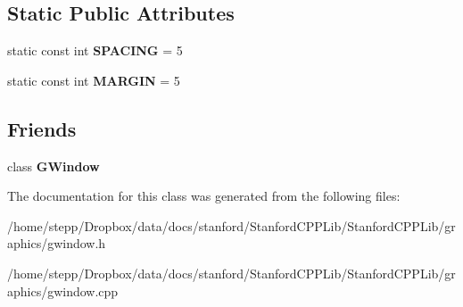 \subsection*{Static Public Attributes}
\begin{DoxyCompactItemize}
\item 
\mbox{\label{class__Internal__QMainWindow_aba0595b4af9c44ed5d2b7edead3c6657}} 
static const int {\bfseries S\+P\+A\+C\+I\+NG} = 5
\item 
\mbox{\label{class__Internal__QMainWindow_ac3393d499999d6641e5c3450747d3c03}} 
static const int {\bfseries M\+A\+R\+G\+IN} = 5
\end{DoxyCompactItemize}
\subsection*{Friends}
\begin{DoxyCompactItemize}
\item 
\mbox{\label{class__Internal__QMainWindow_a20230fe9431fcdad4afa6bfec61b5833}} 
class {\bfseries G\+Window}
\end{DoxyCompactItemize}


The documentation for this class was generated from the following files\+:\begin{DoxyCompactItemize}
\item 
/home/stepp/\+Dropbox/data/docs/stanford/\+Stanford\+C\+P\+P\+Lib/\+Stanford\+C\+P\+P\+Lib/graphics/gwindow.\+h\item 
/home/stepp/\+Dropbox/data/docs/stanford/\+Stanford\+C\+P\+P\+Lib/\+Stanford\+C\+P\+P\+Lib/graphics/gwindow.\+cpp\end{DoxyCompactItemize}
